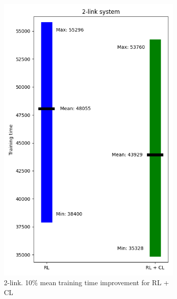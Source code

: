 \begin{figure}[h!]
\begin{subfigure}[t]{0.48\textwidth}
		\includegraphics[width=\textwidth]{Figures/2_link_comparison.png}
		\caption{2-link. 10\% mean training time improvement for RL + CL}
	\end{subfigure}
	\begin{subfigure}[t]{0.48\textwidth}
		\centering

\end{subfigure}
\end{figure}
